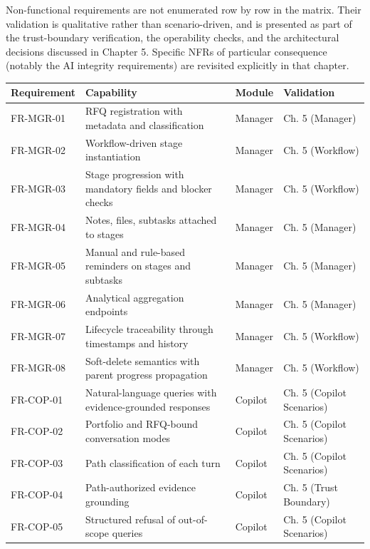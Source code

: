 Non-functional requirements are not enumerated row by row in the matrix. Their validation is qualitative rather than scenario-driven, and is presented as part of the trust-boundary verification, the operability checks, and the architectural decisions discussed in Chapter 5. Specific NFRs of particular consequence (notably the AI integrity requirements) are revisited explicitly in that chapter.

\begin{table}[H]
\centering
\renewcommand{\arraystretch}{1.3}
\begin{tabular}{|p{2cm}|p{6cm}|p{2.5cm}|p{3cm}|}
\hline
\rowcolor{lightgray}
\textbf{Requirement} & \textbf{Capability} & \textbf{Module} & \textbf{Validation} \\ \hline
FR-MGR-01 & RFQ registration with metadata and classification & Manager & Ch. 5 (Manager) \\ \hline
FR-MGR-02 & Workflow-driven stage instantiation & Manager & Ch. 5 (Workflow) \\ \hline
FR-MGR-03 & Stage progression with mandatory fields and blocker checks & Manager & Ch. 5 (Workflow) \\ \hline
FR-MGR-04 & Notes, files, subtasks attached to stages & Manager & Ch. 5 (Manager) \\ \hline
FR-MGR-05 & Manual and rule-based reminders on stages and subtasks & Manager & Ch. 5 (Manager) \\ \hline
FR-MGR-06 & Analytical aggregation endpoints & Manager & Ch. 5 (Manager) \\ \hline
FR-MGR-07 & Lifecycle traceability through timestamps and history & Manager & Ch. 5 (Workflow) \\ \hline
FR-MGR-08 & Soft-delete semantics with parent progress propagation & Manager & Ch. 5 (Workflow) \\ \hline
FR-COP-01 & Natural-language queries with evidence-grounded responses & Copilot & Ch. 5 (Copilot Scenarios) \\ \hline
FR-COP-02 & Portfolio and RFQ-bound conversation modes & Copilot & Ch. 5 (Copilot Scenarios) \\ \hline
FR-COP-03 & Path classification of each turn & Copilot & Ch. 5 (Copilot Scenarios) \\ \hline
FR-COP-04 & Path-authorized evidence grounding & Copilot & Ch. 5 (Trust Boundary) \\ \hline
FR-COP-05 & Structured refusal of out-of-scope queries & Copilot & Ch. 5 (Copilot Scenarios) \\ \hline

\end{tabular}
\end{table}
